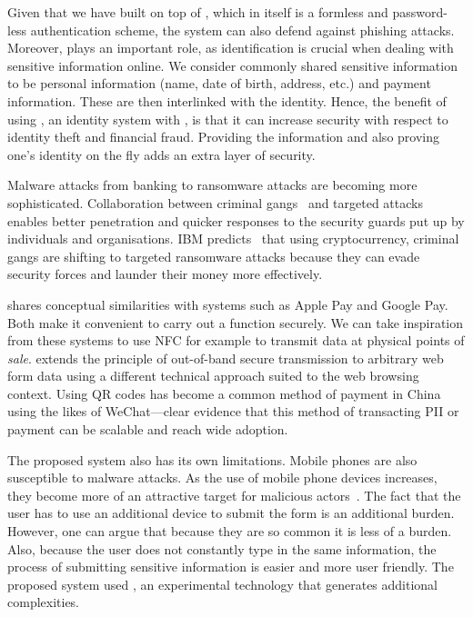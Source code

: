 Given that we have built on top of \deeid, which in itself is a formless and password-less authentication scheme, the system can also defend against phishing attacks. Moreover, \deeid plays an important role, as identification is crucial when dealing with sensitive information online. We consider commonly shared sensitive information to be personal information (name, date of birth, address, etc.) and payment information. These are then interlinked with the identity. Hence, the benefit of using \deeid, an identity system with \formless, is that it can increase security with respect to identity theft and financial fraud. Providing the information and also proving one's identity on the fly adds an extra layer of security.

Malware attacks from banking to ransomware attacks are becoming more sophisticated. Collaboration between criminal gangs~\cite{noauthor_business_2019} and targeted attacks~\cite{cohen_gozi_2019} enables better penetration and quicker responses to the security guards put up by individuals and organisations. IBM predicts~\cite{noauthor_ibm_2019} that using cryptocurrency, criminal gangs are shifting to targeted ransomware attacks because they can evade security forces and launder their money more effectively.

\formless shares conceptual similarities with systems such as Apple Pay and Google Pay. Both make it convenient to carry out a function securely. We can take inspiration from these systems to use NFC for example to transmit data at physical points of \textit{sale}. \formless extends the principle of out-of-band secure transmission to arbitrary web form data using a different technical approach suited to the web browsing context. Using QR codes has become a common method of payment in China using the likes of WeChat---clear evidence that this method of transacting PII or payment can be scalable and reach wide adoption.

The proposed system also has its own limitations. Mobile phones are also susceptible to malware attacks. As the use of mobile phone devices increases, they become more of an attractive target for malicious actors~\cite{szongott_evaluating_2012}. The fact that the user has to use an additional device to submit the form is an additional burden. However, one can argue that because they are so common it is less of a burden. Also, because the user does not constantly type in the same information, the process of submitting sensitive information is easier and more user friendly. The proposed system used \deeid, an experimental technology that generates additional complexities.

